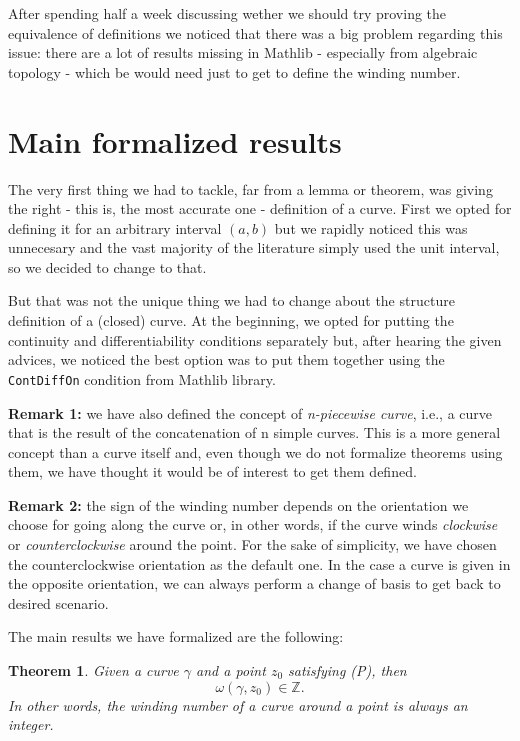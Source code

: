 \documentclass[a4paper,12pt]{article}
\newtheorem{theorem}{Theorem}
\begin{document}
After spending half a week discussing wether we should try proving the equivalence of definitions we
noticed that there was a big problem regarding this issue: there are a lot of results missing in Mathlib
- especially from algebraic topology - which be would need just to get to define the winding number.

\section{Main formalized results}
The very first thing we had to tackle, far from a lemma or theorem, was giving the right - this is, the
most accurate one - definition of a curve. First we opted for defining it for an arbitrary interval $(a, b)$
but we rapidly noticed this was unnecesary and the vast majority of the literature simply used the unit interval,
so we decided to change to that.

But that was not the unique thing we had to change about the structure definition of a (closed) curve. At the beginning, we opted
for putting the continuity and differentiability conditions separately but, after hearing the given advices, we noticed
the best option was to put them together using the \verb|ContDiffOn| condition from Mathlib library.

\noindent \textbf{Remark 1:} we have also defined the concept of \textit{n-piecewise curve}, i.e., a curve that is the result
of the concatenation of n simple curves. This is a more general concept than a curve itself and, even though
we do not formalize theorems using them, we have thought it would be of interest to get them defined.

\noindent \textbf{Remark 2:} the sign of the winding number depends on the orientation we choose for going along
the curve or, in other words, if the curve winds \textit{clockwise} or \textit{counterclockwise} around the point.
For the sake of simplicity, we have chosen the counterclockwise orientation as the default one. In the case a curve is given
in the opposite orientation, we can always perform a change of basis to get back to desired scenario.

The main results we have formalized are the following:
\begin{theorem}
    Given a curve $\gamma$ and a point $z_0$ satisfying (P), then
    $$\omega(\gamma, z_0) \in \mathbb{Z}.$$
    In other words, the winding number of a curve around a point is always an integer.
\end{theorem}
\end{document}
